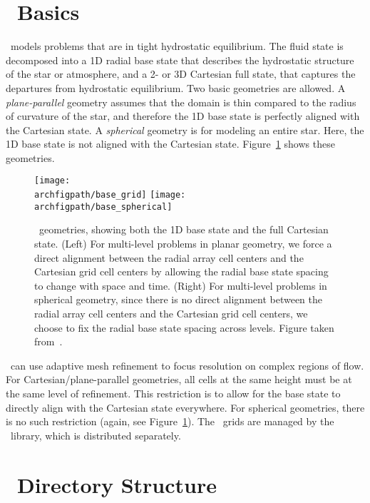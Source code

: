\section{\maestro\ Basics}

\maestro\ models problems that are in tight hydrostatic equilibrium.
The fluid state is decomposed into a 1D radial base state that
describes the hydrostatic structure of the star or atmosphere, and a
2- or 3D Cartesian full state, that captures the departures from
hydrostatic equilibrium.  Two basic geometries are allowed.  A {\em
  plane-parallel} geometry assumes that the domain is thin compared to
the radius of curvature of the star, and therefore the 1D base state
is perfectly aligned with the Cartesian state.  A {\em spherical}
geometry is for modeling an entire star.  Here, the 1D base state is
not aligned with the Cartesian state.  Figure~\ref{fig:base_state}
shows these geometries.

\begin{figure}[tb]
\centering
\texttt{[image: \\archfigpath/base\_grid]} \hspace{0.5in}
\texttt{[image: \\archfigpath/base\_spherical]}
\caption[\maestro\ geometries]{\label{fig:base_state} \maestro\ geometries, showing both the
  1D base state and the full Cartesian state.  (Left) For multi-level
  problems in planar geometry, we force a direct alignment between the
  radial array cell centers and the Cartesian grid cell centers by
  allowing the radial base state spacing to change with space and
  time.  (Right) For multi-level problems in spherical geometry, since
  there is no direct alignment between the radial array cell centers
  and the Cartesian grid cell centers, we choose to fix the radial
  base state spacing across levels. Figure taken
  from~\cite{multilevel}.}
\end{figure}


\maestro\ can use adaptive mesh refinement to focus resolution on
complex regions of flow.  For Cartesian/plane-parallel geometries, all
cells at the same height must be at the same level of refinement.
This restriction is to allow for the base state to directly align with
the Cartesian state everywhere.  For spherical geometries, there is no
such restriction (again, see Figure~\ref{fig:base_state}).
The \maestro\ grids are managed by the \boxlib\ library, which is
distributed separately.



\section{\maestro\ Directory Structure}


